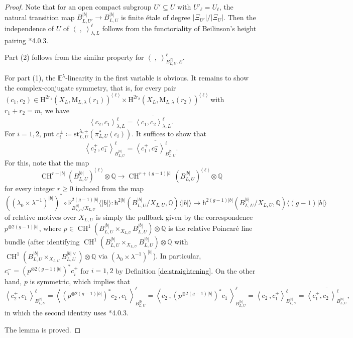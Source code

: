 \documentclass[12pt]{amsart}
\numberwithin{equation}{section}
\theoremstyle{plain}
\theoremstyle{definition}
\theoremstyle{remark}
\renewcommand{\d}[1]{\mathbb{#1}}
\renewcommand{\r}[1]{\mathrm{#1}}
\renewcommand{\sf}[1]{\mathsf{#1}}
\renewcommand{\(}{\left(}
\renewcommand{\)}{\right)}
\newcommand{\ang}[1]{\langle{#1}\rangle}
\newcommand{\ol}[1]{\overline{#1}{}}
\renewcommand{\geq}{\geqslant}
\newcommand{\dE}{\d E}
\newcommand{\dQ}{\d Q}
\newcommand{\rH}{\r H}
\newcommand{\rM}{\r M}
\newcommand{\sfh}{\sf h}
\newcommand{\tF}{\mathtt{F}}
\newcommand{\llangle}{\left\langle}
\newcommand{\rrangle}{\right\rangle}
\newcommand{\st}{\r{st}}
\DeclareMathOperator{\CH}{CH}
\begin{document}
\begin{proof}
Note that for an open compact subgroup $U'\subseteq U$ with $U'_\ell=U_\ell$, the natural transition map $B_{L,U'}^{|b|}\to B_{L,U}^{|b|}$ is finite \'{e}tale of degree $|\Xi_{U'}|/|\Xi_U|$. Then the independence of $U$ of $\llangle\;,\;\rrangle_{\lambda,L}^{\ell}$ follows from the functoriality of Beilinson's height pairing \cite{Bei87}*{4.0.3}.

Part (2) follows from the similar property for $\llangle\;,\;\rrangle_{B_{L,U}^{|b|},E}^\ell$.

For part (1), the $\dE^\lambda$-linearity in the first variable is obvious. It remains to show the complex-conjugate symmetry, that is, for every pair $(c_1,c_2)\in\rH^{2r_1}(X_L,\rM_{L,\lambda}(r_1))^{\ang\ell}\times\rH^{2r_2}(X_L,\rM_{L,\lambda}(r_2))^{\ang\ell}$ with $r_1+r_2=m$, we have
\[
\llangle c_2,c_1\rrangle_{\lambda,L}^{\ell}=\ol{\llangle c_1,c_2\rrangle_{\lambda,L}^{\ell}}.
\]
For $i=1,2$, put $c_i^\pm\coloneqq\st_{L,U}^{\lambda,\pm}(\pi_{L,U}^*(c_i))$. It suffices to show that
\[
\llangle c_2^+,c_1^-\rrangle_{B_{L,U}^{|b|}}^\ell
=\ol{\llangle c_1^+,c_2^-\rrangle_{B_{L,U}^{|b|}}^\ell}.
\]
For this, note that the map
\[
\CH^{r+|b|}(B_{L,U}^{|b|})^{\ang\ell}\otimes\dQ\to\CH^{r+(g-1)|b|}(B_{L,U}^{|b|})^{\ang\ell}\otimes\dQ
\]
for every integer $r\geq 0$ induced from the map
\[
((\lambda_0\times\lambda^{-1})^{|b|})^*\circ\tF^{2(g-1)|b|}_{B_{L,U}^{|b|}/X_{L,U}}\ang{|b|}\colon
\sfh^{2|b|}(B_{L,U}^{|b|}/X_{L,U},\dQ)\ang{|b|}\to
\sfh^{2(g-1)|b|}(B_{L,U}^{|b|}/X_{L,U},\dQ)\ang{(g-1)|b|}
\]
of relative motives over $X_{L,U}$ is simply the pullback given by the correspondence $p^{\otimes 2(g-1)|b|}$, where $p\in\CH^1(B_{L,U}^{|b|}\times_{X_{L,U}}B_{L,U}^{|b|})\otimes\dQ$ is the relative Poincar\'{e} line bundle (after identifying $\CH^1(B_{L,U}^{|b|}\times_{X_{L,U}}B_{L,U}^{|b|})\otimes\dQ$ with $\CH^1(B_{L,U}^{|b|}\times_{X_{L,U}}B_{L,U}^{|b|\vee})\otimes\dQ$ via $(\lambda_0\times\lambda^{-1})^{|b|}$). In particular, $c_i^-=(p^{\otimes 2(g-1)|b|})^*c_i^+$ for $i=1,2$ by Definition \ref{de:straightening}. On the other hand, $p$ is symmetric, which implies that
\[
\llangle c_2^+,c_1^-\rrangle_{B_{L,U}^{|b|}}^\ell=\llangle (p^{\otimes 2(g-1)|b|})^*c_2^-,c_1^-\rrangle_{B_{L,U}^{|b|}}^\ell
=\llangle c_2^-,(p^{\otimes 2(g-1)|b|})^*c_1^-\rrangle_{B_{L,U}^{|b|}}^\ell
=\llangle c_2^-,c_1^+\rrangle_{B_{L,U}^{|b|}}^\ell
=\ol{\llangle c_1^+,c_2^-\rrangle_{B_{L,U}^{|b|}}^\ell},
\]
in which the second identity uses \cite{Bei87}*{4.0.3}.

The lemma is proved.
\end{proof}
\end{document}
